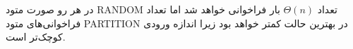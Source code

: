 در هر رو صورت متود RANDOM تعداد $\Theta (n)$ بار فراخوانی خواهد شد اما
تعداد فراخوانی‌های متود PARTITION در بهترین حالت کمتر خواهد بود
زیرا اندازه ورودی کوچک‌تر است.
